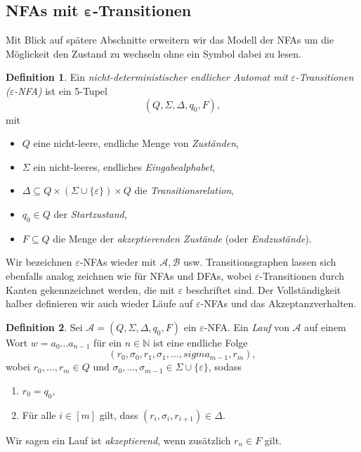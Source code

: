 \documentclass[11pt, a4paper]{article}
\theoremstyle{definition}
\newtheorem{definition}{Definition}[section]
\theoremstyle{plain}
\numberwithin{equation}{section}
\begin{document}
\subsection[NFAs mit $\varepsilon$-Transitionen]{NFAs mit $\bm{\varepsilon}$-Transitionen}
Mit Blick auf spätere Abschnitte erweitern wir das Modell der NFAs um die Möglickeit den Zustand zu wechseln ohne ein Symbol dabei zu lesen.
\begin{definition}
	Ein \textit{nicht-deterministischer endlicher Automat mit} \textit{\(\varepsilon\)-Transitionen (\(\varepsilon\)-NFA)} ist ein 5-Tupel
	\[
		(Q, \Sigma, \Delta, q_0, F),
	\]
	mit
	\begin{itemize}
		\item \( Q \) eine nicht-leere, endliche Menge von \textit{Zuständen},
		\item \( \Sigma \) ein nicht-leeres, endliches \textit{Eingabealphabet},
		\item \( \Delta \subseteq Q \times (\Sigma \cup \{\varepsilon\}) \times Q \) die \textit{Transitionsrelation},
		\item \( q_0 \in Q \) der \textit{Startzustand},
		\item \(F \subseteq Q \) die Menge der \textit{akzeptierenden Zustände} (oder \textit{Endzustände}).
	\end{itemize}
\end{definition}
Wir bezeichnen \(\varepsilon\)-NFAs wieder mit \( \mathcal{A}, \mathcal{B} \) usw. Transitionsgraphen lassen sich ebenfalls analog zeichnen wie für NFAs und DFAs, wobei \(\varepsilon\)-Transitionen durch Kanten gekennzeichnet werden, die mit \( \varepsilon \) beschriftet sind. Der Voll\-stän\-dig\-keit halber definieren wir auch wieder Läufe auf \(\varepsilon\)-NFAs und das Akzeptanzverhalten.
\begin{definition}
	Sei \( \mathcal{A} = (Q, \Sigma, \Delta, q_0, F) \) ein \(\varepsilon\)-NFA.
	Ein \textit{Lauf} von \( \mathcal{A} \) auf einem Wort \( w = a_0 \ldots a_{n-1} \) für ein \( n \in \mathbb{N} \) ist eine endliche Folge
	\[
		(r_0, \sigma_0, r_1, \sigma_1, \ldots, sigma_{m-1}, r_m),
	\]
	wobei \( r_0, \ldots, r_m \in Q \) und \( \sigma_0, \ldots, \sigma_{m-1} \in \Sigma \cup \{\varepsilon\} \), sodass
	\begin{enumerate}
		\item \( r_0 = q_0 \),
		\item Für alle \( i \in [m] \) gilt, dass \( (r_i, \sigma_i, r_{i+1}) \in \Delta \).
	\end{enumerate}
	Wir sagen ein Lauf ist \textit{akzeptierend}, wenn zusätzlich \( r_n \in F \) gilt.
\end{definition}
\end{document}
